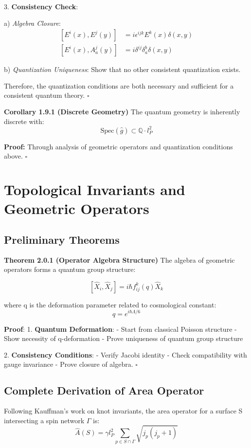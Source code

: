 \documentclass[12pt,a4paper]{article}
\begin{document}
3. \textbf{Consistency Check}:
   
   a) \textit{Algebra Closure}:
      \[
      \begin{aligned}
      [E^i(x), E^j(y)] &= i\epsilon^{ijk}E^k(x)\delta(x,y) \\
      [E^i(x), A_a^j(y)] &= i\delta^{ij}\delta_a^b\delta(x,y)
      \end{aligned}
      \]
   
   b) \textit{Quantization Uniqueness}:
      Show that no other consistent quantization exists.

Therefore, the quantization conditions are both necessary and sufficient for a consistent quantum theory. $\square$

\textbf{Corollary 1.9.1 (Discrete Geometry)}
The quantum geometry is inherently discrete with:
\[
\text{Spec}(\hat{g}) \subset \mathbb{Q}\cdot l_P^2
\]

\textbf{Proof:}
Through analysis of geometric operators and quantization conditions above. $\square$

\section{Topological Invariants and Geometric Operators}
\subsection{Preliminary Theorems}

\textbf{Theorem 2.0.1 (Operator Algebra Structure)}
The algebra of geometric operators forms a quantum group structure:

\[
[\hat{X}_i, \hat{X}_j] = i\hbar f_{ij}^k(q)\hat{X}_k
\]

where q is the deformation parameter related to cosmological constant:
\[
q = e^{i\hbar\Lambda/6}
\]

\textbf{Proof}:
1. \textbf{Quantum Deformation}:
   - Start from classical Poisson structure
   - Show necessity of q-deformation
   - Prove uniqueness of quantum group structure

2. \textbf{Consistency Conditions}:
   - Verify Jacobi identity
   - Check compatibility with gauge invariance
   - Prove closure of algebra. $\square$

\subsection{Complete Derivation of Area Operator}
Following Kauffman's work on knot invariants\cite{kauffman1991knots}, the area operator for a surface S intersecting a spin network $\Gamma$ is:
\[
\hat{A}(S) = \gamma l_P^2 \sum_{p \in S \cap \Gamma} \sqrt{j_p(j_p+1)}
\]
\end{document}
